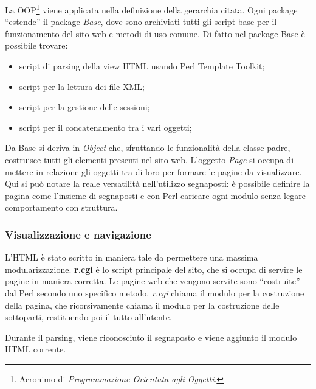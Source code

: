 La OOP\footnote{Acronimo di \textit{Programmazione Orientata agli Oggetti}.} viene applicata nella definizione della gerarchia citata. Ogni package ``estende'' il package \textit{Base}, dove sono archiviati tutti gli script base per il funzionamento del sito web e metodi di uso comune. Di fatto nel package Base \`e possibile trovare:
\begin{itemize}
\item script di parsing della view HTML usando Perl Template Toolkit;
\item script per la lettura dei file XML;
\item script per la gestione delle sessioni;
\item script per il concatenamento tra i vari oggetti;
\end{itemize}

Da Base si deriva in \textit{Object} che, sfruttando le funzionalit\`a della classe padre, costruisce tutti gli elementi presenti nel sito web. L'oggetto \textit{Page} si occupa di mettere in relazione gli oggetti tra di loro per formare le pagine da visualizzare. Qui si pu\`o notare la reale versatilit\`a nell'utilizzo segnaposti: \`e possibile definire la pagina come l'insieme di segnaposti e con Perl caricare ogni modulo \underline{senza legare} comportamento con struttura.




\subsubsection{Visualizzazione e navigazione}

L'HTML \`e stato scritto in maniera tale da permettere una massima modularizzazione. \textbf{r.cgi} \`e lo script principale del sito, che si occupa di servire le pagine in maniera corretta.
Le pagine web che vengono servite sono ``costruite'' dal Perl secondo uno specifico metodo. \textit{r.cgi} chiama il modulo per la costruzione della pagina, che ricorsivamente chiama il modulo per la costruzione delle sottoparti, restituendo poi il tutto all'utente.

Durante il parsing, viene riconosciuto il segnaposto e viene aggiunto il modulo HTML corrente.


